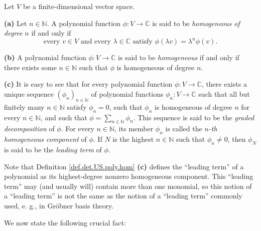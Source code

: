 \documentclass[etingof-lie.tex]{subfiles}
\begin{document}
\begin{definition}
\label{def.det.US.poly.hom}Let $V$ be a finite-dimensional vector space.

\textbf{(a)} Let $n\in\mathbb{N}$. A polynomial function $\phi:V\rightarrow
\mathbb{C}$ is said to be \textit{homogeneous of degree }$n$ if and only if%
\[
\text{every }v\in V\text{ and every }\lambda\in\mathbb{C}\text{ satisfy }%
\phi\left(  \lambda v\right)  =\lambda^{n}\phi\left(  v\right)  .
\]


\textbf{(b)} A polynomial function $\phi:V\rightarrow\mathbb{C}$ is said to be
\textit{homogeneous} if and only if there exists some $n\in\mathbb{N}$ such
that $\phi$ is homogeneous of degree $n$.

\textbf{(c)} It is easy to see that for every polynomial function
$\phi:V\rightarrow\mathbb{C}$, there exists a unique sequence $\left(
\phi_{n}\right)  _{n\in\mathbb{N}}$ of polynomial functions $\phi
_{n}:V\rightarrow\mathbb{C}$ such that all but finitely many $n\in\mathbb{N}$
satisfy $\phi_{n}=0$, such that $\phi_{n}$ is homogeneous of degree $n$ for
every $n\in\mathbb{N}$, and such that $\phi=\sum\limits_{n\in\mathbb{N}}%
\phi_{n}$. This sequence is said to be the \textit{graded decomposition} of
$\phi$. For every $n\in\mathbb{N}$, its member $\phi_{n}$ is called the
$n$\textit{-th homogeneous component} of $\phi$. If $N$ is the highest
$n\in\mathbb{N}$ such that $\phi_{n}\neq0$, then $\phi_{N}$ is said to be the
\textit{leading term} of $\phi$.
\end{definition}

Note that Definition \ref{def.det.US.poly.hom} \textbf{(c)} defines the
``leading term'' of a polynomial as its highest-degree nonzero homogeneous
component. This ``leading term'' may (and usually will) contain more than one
monomial, so this notion of a ``leading term'' is not the same as the notion
of a ``leading term'' commonly used, e. g., in Gr\"{o}bner basis theory.

We now state the following crucial fact:
\end{document}
